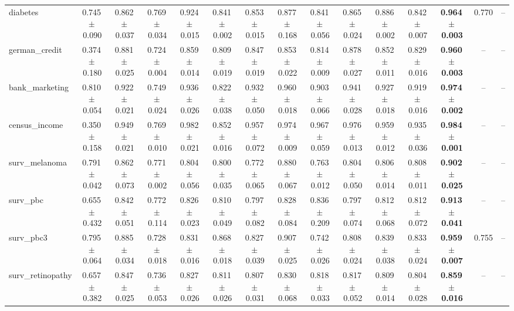 \documentclass[8pt]{extarticle}
\begin{document}
\begin{longtable}{l*{14}{c}}
diabetes & 0.745\,$\pm$\,0.090 & 0.862\,$\pm$\,0.037 & 0.769\,$\pm$\,0.034 & 0.924\,$\pm$\,0.015 & 0.841\,$\pm$\,0.002 & 0.853\,$\pm$\,0.015 & 0.877\,$\pm$\,0.168 & 0.841\,$\pm$\,0.056 & 0.865\,$\pm$\,0.024 & 0.886\,$\pm$\,0.002 & 0.842\,$\pm$\,0.007 & \textbf{0.964\,$\pm$\,0.003} & 0.770 & -- \\
german\_credit & 0.374\,$\pm$\,0.180 & 0.881\,$\pm$\,0.025 & 0.724\,$\pm$\,0.004 & 0.859\,$\pm$\,0.014 & 0.809\,$\pm$\,0.019 & 0.847\,$\pm$\,0.019 & 0.853\,$\pm$\,0.022 & 0.814\,$\pm$\,0.009 & 0.878\,$\pm$\,0.027 & 0.852\,$\pm$\,0.011 & 0.829\,$\pm$\,0.016 & \textbf{0.960\,$\pm$\,0.003} & -- & -- \\
bank\_marketing & 0.810\,$\pm$\,0.054 & 0.922\,$\pm$\,0.021 & 0.749\,$\pm$\,0.024 & 0.936\,$\pm$\,0.026 & 0.822\,$\pm$\,0.038 & 0.932\,$\pm$\,0.050 & 0.960\,$\pm$\,0.018 & 0.903\,$\pm$\,0.066 & 0.941\,$\pm$\,0.028 & 0.927\,$\pm$\,0.018 & 0.919\,$\pm$\,0.016 & \textbf{0.974\,$\pm$\,0.002} & -- & -- \\
census\_income & 0.350\,$\pm$\,0.158 & 0.949\,$\pm$\,0.021 & 0.769\,$\pm$\,0.010 & 0.982\,$\pm$\,0.021 & 0.852\,$\pm$\,0.016 & 0.957\,$\pm$\,0.072 & 0.974\,$\pm$\,0.009 & 0.967\,$\pm$\,0.059 & 0.976\,$\pm$\,0.013 & 0.959\,$\pm$\,0.012 & 0.935\,$\pm$\,0.036 & \textbf{0.984\,$\pm$\,0.001} & -- & -- \\
surv\_melanoma & 0.791\,$\pm$\,0.042 & 0.862\,$\pm$\,0.073 & 0.771\,$\pm$\,0.002 & 0.804\,$\pm$\,0.056 & 0.800\,$\pm$\,0.035 & 0.772\,$\pm$\,0.065 & 0.880\,$\pm$\,0.067 & 0.763\,$\pm$\,0.012 & 0.804\,$\pm$\,0.050 & 0.806\,$\pm$\,0.014 & 0.808\,$\pm$\,0.011 & \textbf{0.902\,$\pm$\,0.025} & -- & -- \\
surv\_pbc & 0.655\,$\pm$\,0.432 & 0.842\,$\pm$\,0.051 & 0.772\,$\pm$\,0.114 & 0.826\,$\pm$\,0.023 & 0.810\,$\pm$\,0.049 & 0.797\,$\pm$\,0.082 & 0.828\,$\pm$\,0.084 & 0.836\,$\pm$\,0.209 & 0.797\,$\pm$\,0.074 & 0.812\,$\pm$\,0.068 & 0.812\,$\pm$\,0.072 & \textbf{0.913\,$\pm$\,0.041} & -- & -- \\
surv\_pbc3 & 0.795\,$\pm$\,0.064 & 0.885\,$\pm$\,0.034 & 0.728\,$\pm$\,0.018 & 0.831\,$\pm$\,0.016 & 0.868\,$\pm$\,0.018 & 0.827\,$\pm$\,0.039 & 0.907\,$\pm$\,0.025 & 0.742\,$\pm$\,0.026 & 0.808\,$\pm$\,0.024 & 0.839\,$\pm$\,0.038 & 0.833\,$\pm$\,0.024 & \textbf{0.959\,$\pm$\,0.007} & 0.755 & -- \\
surv\_retinopathy & 0.657\,$\pm$\,0.382 & 0.847\,$\pm$\,0.025 & 0.736\,$\pm$\,0.053 & 0.827\,$\pm$\,0.026 & 0.811\,$\pm$\,0.026 & 0.807\,$\pm$\,0.031 & 0.830\,$\pm$\,0.068 & 0.818\,$\pm$\,0.033 & 0.817\,$\pm$\,0.052 & 0.809\,$\pm$\,0.014 & 0.804\,$\pm$\,0.028 & \textbf{0.859\,$\pm$\,0.016} & -- & -- \\

\end{longtable}
\end{document}

